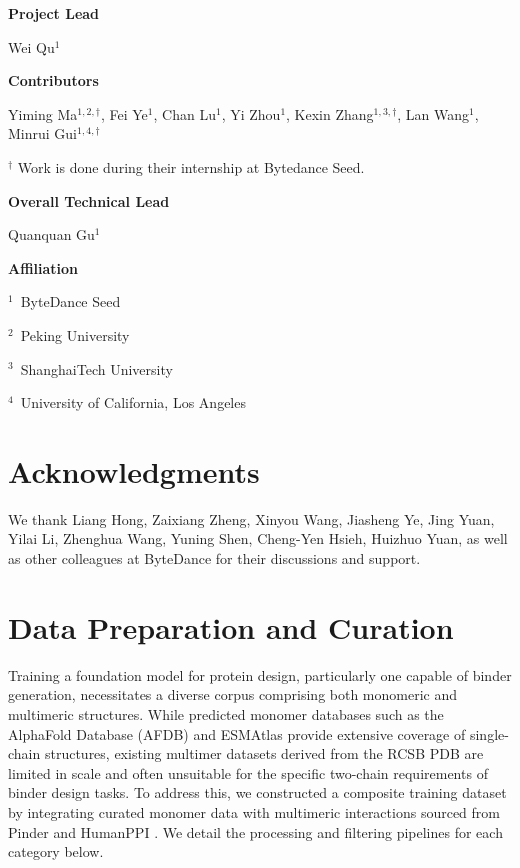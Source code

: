 \documentclass[]{bytedance_seed}
\begin{document}
\textbf{Project Lead}

Wei Qu$^{1}$


\textbf{Contributors}

Yiming Ma$^{1,2,\dagger}$, Fei Ye$^{1}$, Chan Lu$^{1}$, Yi Zhou$^{1}$, Kexin Zhang$^{1,3,\dagger}$, Lan Wang$^{1}$, Minrui Gui$^{1,4,\dagger}$

$^ \dagger$ Work is done during their internship at Bytedance Seed.

\textbf{Overall Technical Lead}

Quanquan Gu$^{1}$

\textbf{Affiliation}

$^1$~ByteDance Seed

$^2$~Peking University

$^3$~ShanghaiTech University

$^4$~University of California, Los Angeles

\section*{Acknowledgments}

We thank Liang Hong, Zaixiang Zheng, Xinyou Wang, Jiasheng Ye, Jing Yuan, Yilai Li, Zhenghua Wang, Yuning Shen, Cheng-Yen Hsieh, Huizhuo Yuan, as well as other colleagues at ByteDance for their discussions and support.


\clearpage


% 


\clearpage

\beginappendix


\section{Data Preparation and Curation}
\label{app:data_prep}

Training a foundation model for protein design, particularly one capable of binder generation, necessitates a diverse corpus comprising both monomeric and multimeric structures. While predicted monomer databases such as the AlphaFold Database (AFDB) \cite{varadiAlphaFoldProteinStructure2022a} and ESMAtlas \cite{lin2023evolutionary} provide extensive coverage of single-chain structures, existing multimer datasets derived from the RCSB PDB \cite{berman2000protein} are limited in scale and often unsuitable for the specific two-chain requirements of binder design tasks. To address this, we constructed a composite training dataset by integrating curated monomer data with multimeric interactions sourced from Pinder \cite{kovtun2024pinder} and HumanPPI \cite{zhangPredictingProteinproteinInteractions2025}. We detail the processing and filtering pipelines for each category below.
\end{document}
